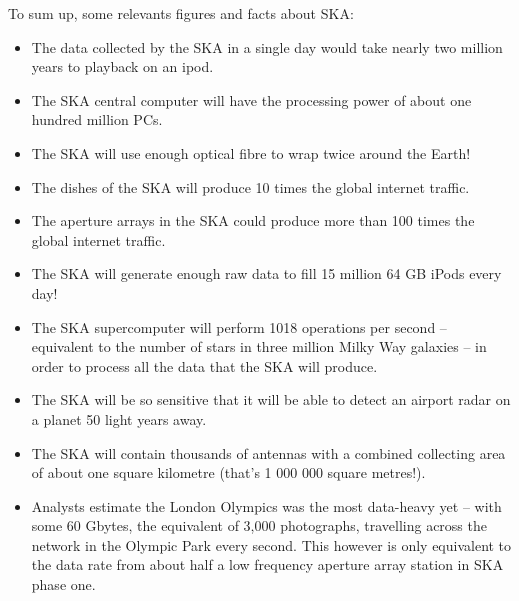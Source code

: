 To sum up, some relevants figures and facts about SKA:

\begin{itemize}

\item The data collected by the SKA in a single day would take nearly two million years to playback on an ipod.
\item The SKA central computer will have the processing power of about one hundred million PCs.
\item The SKA will use enough optical fibre to wrap twice around the Earth!
\item The dishes of the SKA will produce 10 times the global internet traffic.
\item The aperture arrays in the SKA could produce more than 100 times the global internet traffic.
\item The SKA will generate enough raw data to fill 15 million 64 GB iPods every day!
\item The SKA supercomputer will perform 1018 operations per second – equivalent to the number of stars in three million Milky Way galaxies – in order to process all the data that the SKA will produce.
\item The SKA will be so sensitive that it will be able to detect an airport radar on a planet 50 light years away.
\item The SKA will contain thousands of antennas with a combined collecting area of about one square kilometre (that’s 1 000 000 square metres!).
\item Analysts estimate the London Olympics was the most data-heavy yet – with some 60 Gbytes, the equivalent of 3,000 photographs, travelling across the network in the Olympic Park every second. This however is only equivalent to the data rate from about half a low frequency aperture array station in SKA phase one.

\end{itemize}